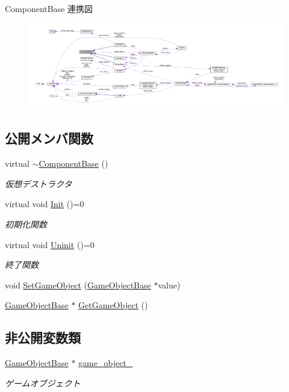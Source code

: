 Component\+Base 連携図\nopagebreak
\begin{figure}[H]
\begin{center}
\leavevmode
\includegraphics[width=350pt]{class_component_base__coll__graph}
\end{center}
\end{figure}
\subsection*{公開メンバ関数}
\begin{DoxyCompactItemize}
\item 
virtual \mbox{\hyperlink{class_component_base_a5d22c6d5f792ff42ab6cb11a8ac38478}{$\sim$\+Component\+Base}} ()
\begin{DoxyCompactList}\small\item\em 仮想デストラクタ \end{DoxyCompactList}\item 
virtual void \mbox{\hyperlink{class_component_base_a125939d6befe42f28886a6523e86b18b}{Init}} ()=0
\begin{DoxyCompactList}\small\item\em 初期化関数 \end{DoxyCompactList}\item 
virtual void \mbox{\hyperlink{class_component_base_a9f42beaf0383d6f629819579cab4de57}{Uninit}} ()=0
\begin{DoxyCompactList}\small\item\em 終了関数 \end{DoxyCompactList}\item 
void \mbox{\hyperlink{class_component_base_ac9fc08588e3d29caf8d692a3392fc7b0}{Set\+Game\+Object}} (\mbox{\hyperlink{class_game_object_base}{Game\+Object\+Base}} $\ast$value)
\item 
\mbox{\hyperlink{class_game_object_base}{Game\+Object\+Base}} $\ast$ \mbox{\hyperlink{class_component_base_a0ac0d71aeeb768401f34a2e780b1e25d}{Get\+Game\+Object}} ()
\end{DoxyCompactItemize}
\subsection*{非公開変数類}
\begin{DoxyCompactItemize}
\item 
\mbox{\hyperlink{class_game_object_base}{Game\+Object\+Base}} $\ast$ \mbox{\hyperlink{class_component_base_a60a43b42437cd5be2b05d2f4f4dd8147}{game\+\_\+object\+\_\+}}
\begin{DoxyCompactList}\small\item\em ゲームオブジェクト \end{DoxyCompactList}\end{DoxyCompactItemize}


